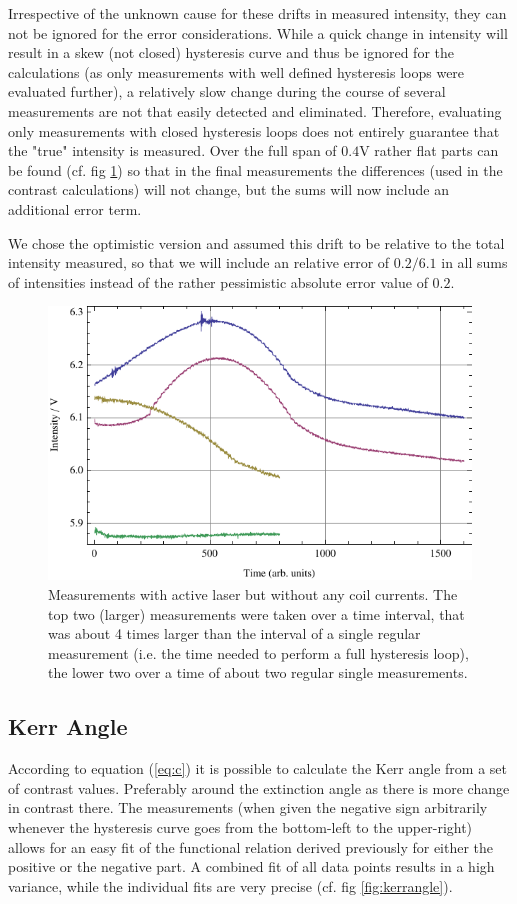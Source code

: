 \documentclass[a4paper]{scrartcl}
\numberwithin{equation}{section}
\numberwithin{figure}{section}
\numberwithin{table}{section}
\newcommand{\Formel}[1]{(\ref{#1})}
\begin{document}
Irrespective of the unknown cause for these drifts in measured intensity, they can not be ignored for the error considerations. While a quick change in intensity will result in a skew (not closed) hysteresis curve and thus be ignored for the calculations (as only measurements with well defined hysteresis loops were evaluated further), a relatively slow change during the course of several measurements are not that easily detected and eliminated. Therefore, evaluating only measurements with closed hysteresis loops does not entirely guarantee that the "true" intensity is measured. Over the full span of $0.4$V rather flat parts can be found (cf. fig \ref{fig:waal}) so that in the final measurements the differences (used in the contrast calculations) will not change, but the sums will now include an additional error term.%

We chose the optimistic version and assumed this drift to be relative to the total intensity measured, so that we will include an relative error of $0.2/6.1$ in all sums of intensities instead of the rather pessimistic absolute error value of $0.2$.
\begin{figure} 
 \centering
         \includegraphics[width=0.45\linewidth]{img/drift.pdf}
\caption{
\small Measurements with active laser but without any coil currents. The top two (larger) measurements were taken over a time interval, that was about 4 times larger than the interval of a single regular measurement (i.e. the time needed to perform a full hysteresis loop), the lower two over a time of about two regular single measurements. } 
	\label{fig:waal}
\end{figure}


\subsection{Kerr Angle}
According to equation \Formel{eq:c} it is possible to calculate the Kerr angle from a set of contrast values. Preferably around the extinction angle as there is more change in contrast there. The measurements (when given the negative sign arbitrarily whenever the hysteresis curve goes from the bottom-left to the upper-right) allows for an easy fit of the functional relation derived previously for either the positive or the negative part. A combined fit of all data points results in a high variance, while the individual fits are very precise (cf. fig \ref{fig:kerrangle}).
\end{document}
